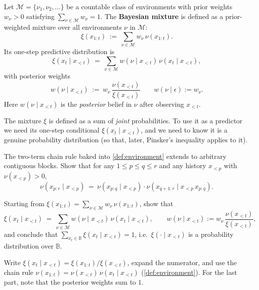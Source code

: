 \documentclass[fontsize=11pt, parskip=half]{scrartcl}
\newcommand{\Mc}{\mathcal{M}}
\begin{document}
\begin{definition}\label{def:mixture}
Let $\Mc = \{\nu_1, \nu_2, \dots\}$ be a countable class of environments with prior weights $w_\nu > 0$ satisfying $\sum_{\nu \in \Mc} w_\nu = 1$. The \textbf{Bayesian mixture} is defined as a prior-weighted mixture over all environments $\nu$ in $\Mc$:
\begin{equation}\label{eq:mixture_expression}
  \xi(x_{1:t}) ~:=~ \sum_{\nu \in \Mc} w_\nu\, \nu(x_{1:t}).
\end{equation}
Its one-step predictive distribution is
\[
  \xi(x_t \mid x_{<t}) ~=~ \sum_{\nu \in \Mc} w(\nu \mid x_{<t})\, \nu(x_t \mid x_{<t}),
\]
with posterior weights 
\[
w(\nu \mid x_{<t}) ~:=~ w_\nu\, \frac{\nu(x_{<t})}{\xi(x_{<t})}
\qquad w(\nu \mid \epsilon) := w_\nu.
\]
Here $w(\nu \mid x_{<t})$ is the \emph{posterior} belief in $\nu$ after observing $x_{<t}$.
\end{definition}

The mixture $\xi$ is defined as a sum of \emph{joint} probabilities. To use it as a predictor we need its one-step conditional $\xi(x_t \mid x_{<t})$, and we need to know it is a genuine probability distribution (so that, later, Pinsker's inequality applies to it).

\begin{exercise}
\label{prob:chain_rule_gen_ex}



The two-term chain rule baked into \cref{def:environment} extends to arbitrary contiguous blocks. Show that for any $1 \leq p \leq q \leq r$ and any history $x_{<p}$ with $\nu(x_{<p}) > 0$,
\[
  \nu(x_{p:r} \mid x_{<p}) ~=~ \nu(x_{p:q} \mid x_{<p}) \cdot \nu(x_{q+1:r} \mid x_{<p}\, x_{p:q}).
\]
\end{exercise}


\begin{exercise}
\label{prob:one_step_ex}



Starting from $\xi(x_{1:t}) = \sum_{\nu \in \Mc} w_\nu\, \nu(x_{1:t})$, show that
\[
\xi(x_t \mid x_{<t}) ~=~ \sum_{\nu \in \Mc} w(\nu \mid x_{<t})\, \nu(x_t \mid x_{<t}),
\qquad w(\nu \mid x_{<t}) := w_\nu\, \frac{\nu(x_{<t})}{\xi(x_{<t})},
\]
and conclude that $\sum_{x_t \in \mathbb{B}} \xi(x_t \mid x_{<t}) = 1$, i.e.\ $\xi(\cdot \mid x_{<t})$ is a probability distribution over $\mathbb{B}$.

\begin{hint}
Write $\xi(x_t \mid x_{<t}) = \xi(x_{1:t}) / \xi(x_{<t})$, expand the numerator, and use the chain rule $\nu(x_{1:t}) = \nu(x_{<t})\, \nu(x_t \mid x_{<t})$ (\cref{def:environment}). For the last part, note that the posterior weights sum to $1$.
\end{hint}
\end{exercise}
\end{document}
